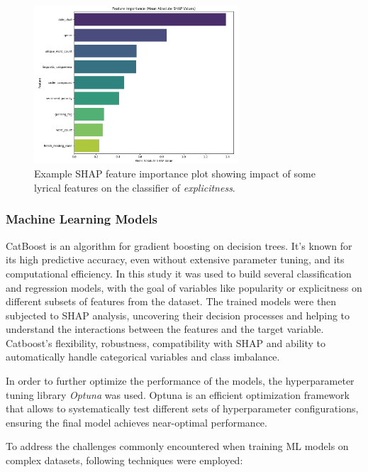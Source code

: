 \begin{center}
\begin{figure}[H]
  \centering
  \includegraphics[width=3in]{img/shap_feature_importance.png}
  \caption{Example SHAP feature importance plot showing impact of some lyrical features
  on the classifier of \textit{explicitness}.}
  \label{Figure:fig_beh}
\end{figure}
\end{center}

\subsubsection*{Machine Learning Models}
CatBoost is an algorithm for gradient boosting on decision trees. It's known
for its high predictive accuracy, even without extensive parameter tuning, and
its computational efficiency. In this study it was used to build several
classification and regression models, with the goal of variables like
popularity or explicitness on different subsets of features from the dataset.
The trained models were then subjected to SHAP analysis, uncovering their
decision processes and helping to understand the interactions between the
features and the target variable. Catboost's flexibility, robustness,
compatibility with SHAP and ability to automatically handle categorical
variables and class imbalance.\cite{catboost}


In order to further optimize the performance of the models, the
hyperparameter tuning library \textit{Optuna} was used. Optuna is an
efficient optimization framework that allows to systematically test different
sets of hyperparameter configurations, ensuring the final model achieves
near-optimal performance.\cite{optuna} 

To address the challenges commonly encountered when training ML models on
complex datasets, following techniques were employed:

